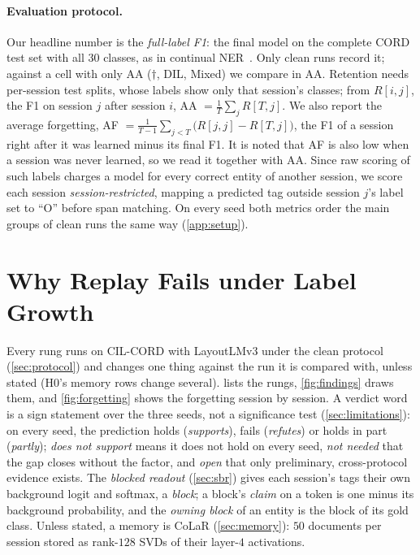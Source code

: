\documentclass[10pt,twocolumn,letterpaper]{article}
\begin{document}
\paragraph{Evaluation protocol.} Our headline number is the \emph{full-label F1}: the final model on the complete CORD test set with all 30 classes, as in continual NER~\citep{ma2023learning}. Only clean runs record it; against a cell with only AA ($\dagger$, DIL, Mixed) we compare in AA. Retention needs per-session test splits, whose labels show only that session's classes; from $R[i,j]$, the F1 on session $j$ after session $i$, AA $=\tfrac1T\sum_j R[T,j]$. We also report the average forgetting, AF $=\tfrac1{T-1}\sum_{j<T}\big(R[j,j]-R[T,j]\big)$, the F1 of a session right after it was learned minus its final F1. It is noted that AF is also low when a session was never learned, so we read it together with AA. Since raw scoring of such labels charges a model for every correct entity of another session, we score each session \emph{session-restricted}, mapping a predicted tag outside session $j$'s label set to ``O'' before span matching. On every seed both metrics order the main groups of clean runs the same way (\cref{app:setup}).

\section{Why Replay Fails under Label Growth}
\label{sec:investigation}
Every rung runs on CIL-CORD with LayoutLMv3 under the clean protocol (\cref{sec:protocol}) and changes one thing against the run it is compared with, unless stated (H0's memory rows change several).  lists the rungs, \cref{fig:findings} draws them, and \cref{fig:forgetting} shows the forgetting session by session. A verdict word is a sign statement over the three seeds, not a significance test (\cref{sec:limitations}): on every seed, the prediction holds (\emph{supports}), fails (\emph{refutes}) or holds in part (\emph{partly}); \emph{does not support} means it does not hold on every seed, \emph{not needed} that the gap closes without the factor, and \emph{open} that only preliminary, cross-protocol evidence exists. The \emph{blocked readout} (\cref{sec:sbr}) gives each session's tags their own background logit and softmax, a \emph{block}; a block's \emph{claim} on a token is one minus its background probability, and the \emph{owning block} of an entity is the block of its gold class. Unless stated, a memory is CoLaR (\cref{sec:memory}): $50$ documents per session stored as rank-$128$ SVDs of their layer-$4$ activations.
\end{document}
